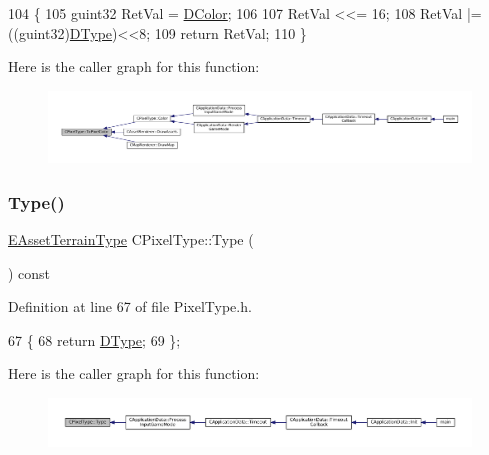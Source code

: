 \begin{DoxyCode}
104                                       \{
105     guint32 RetVal = \hyperlink{classCPixelType_a474243cf748aee94cfa207659e940b6c}{DColor};
106     
107     RetVal <<= 16;
108     RetVal |= ((guint32)\hyperlink{classCPixelType_aca37f042b510a349e0d3209c73ae51c5}{DType})<<8;
109     \textcolor{keywordflow}{return} RetVal;
110 \}
\end{DoxyCode}
Here is the caller graph for this function\+:
\nopagebreak
\begin{figure}[H]
\begin{center}
\leavevmode
\includegraphics[width=350pt]{classCPixelType_abdad3e51c47f410745f7795931798cb3_icgraph}
\end{center}
\end{figure}
\hypertarget{classCPixelType_ac2d23be310266e7679b248435f05f2d3}{}\label{classCPixelType_ac2d23be310266e7679b248435f05f2d3} 
\subsubsection{\texorpdfstring{Type()}{Type()}}
{\footnotesize\ttfamily \hyperlink{classCPixelType_af06457fd1c2ff34c67ce670e633a10b0}{E\+Asset\+Terrain\+Type} C\+Pixel\+Type\+::\+Type (\begin{DoxyParamCaption}{ }\end{DoxyParamCaption}) const\hspace{0.3cm}{\ttfamily [inline]}}



Definition at line 67 of file Pixel\+Type.\+h.


\begin{DoxyCode}
67                                       \{
68             \textcolor{keywordflow}{return} \hyperlink{classCPixelType_aca37f042b510a349e0d3209c73ae51c5}{DType};  
69         \};
\end{DoxyCode}
Here is the caller graph for this function\+:
\nopagebreak
\begin{figure}[H]
\begin{center}
\leavevmode
\includegraphics[width=350pt]{classCPixelType_ac2d23be310266e7679b248435f05f2d3_icgraph}
\end{center}
\end{figure}


